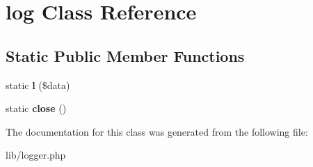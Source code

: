 \section{log Class Reference}
\label{classlog}
\subsection*{Static Public Member Functions}
\begin{DoxyCompactItemize}
\item 
static {\bfseries l} (\$data)\label{classlog_ab3d41665498e6068ba670b37b3f8efbb}

\item 
static {\bfseries close} ()\label{classlog_a1d68d0d72e16e18dfe327f39868b8fb5}

\end{DoxyCompactItemize}


The documentation for this class was generated from the following file:\begin{DoxyCompactItemize}
\item 
lib/logger.php\end{DoxyCompactItemize}
